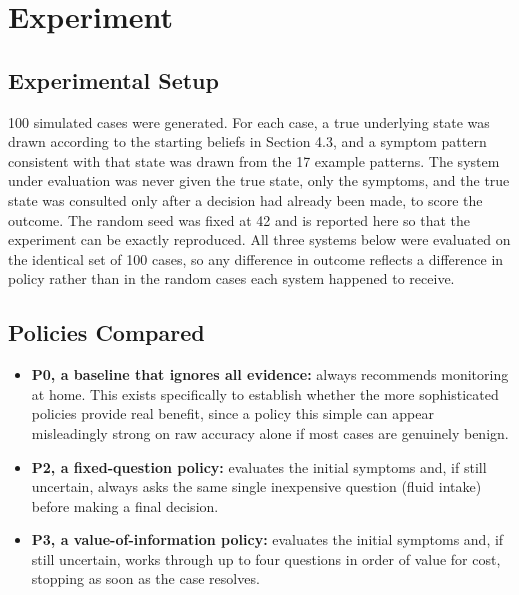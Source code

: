 \documentclass{article}
\begin{document}
\hypertarget{experiment}{%
\section{Experiment}\label{experiment}}

\hypertarget{experimental-setup}{%
\subsection{Experimental Setup}\label{experimental-setup}}

100 simulated cases were generated. For each case, a true underlying
state was drawn according to the starting beliefs in Section 4.3, and a
symptom pattern consistent with that state was drawn from the 17 example
patterns. The system under evaluation was never given the true state,
only the symptoms, and the true state was consulted only after a
decision had already been made, to score the outcome. The random seed
was fixed at 42 and is reported here so that the experiment can be
exactly reproduced. All three systems below were evaluated on the
identical set of 100 cases, so any difference in outcome reflects a
difference in policy rather than in the random cases each system
happened to receive.

\hypertarget{policies-compared}{%
\subsection{Policies Compared}\label{policies-compared}}

\begin{itemize}
\tightlist
\item
  \textbf{P0, a baseline that ignores all evidence:} always recommends
  monitoring at home. This exists specifically to establish whether the
  more sophisticated policies provide real benefit, since a policy this
  simple can appear misleadingly strong on raw accuracy alone if most
  cases are genuinely benign.
\item
  \textbf{P2, a fixed-question policy:} evaluates the initial symptoms
  and, if still uncertain, always asks the same single inexpensive
  question (fluid intake) before making a final decision.
\item
  \textbf{P3, a value-of-information policy:} evaluates the initial
  symptoms and, if still uncertain, works through up to four questions
  in order of value for cost, stopping as soon as the case resolves.
\end{itemize}
\end{document}
